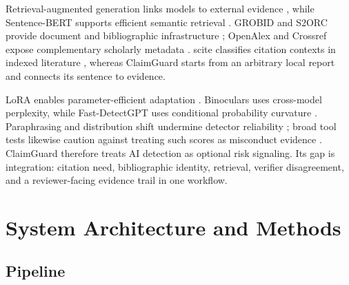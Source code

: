 \documentclass[12pt,toc=bib,toc=listof]{scrartcl}
\begin{document}
Retrieval-augmented generation links models to external evidence \cite{lewis2020}, while Sentence-BERT supports efficient semantic retrieval \cite{reimers2019}. GROBID and S2ORC provide document and bibliographic infrastructure \cite{lopez2009,lo2020}; OpenAlex and Crossref expose complementary scholarly metadata \cite{priem2022,crossref}. scite classifies citation contexts in indexed literature \cite{nicholson2021}, whereas ClaimGuard starts from an arbitrary local report and connects its sentence to evidence.

LoRA enables parameter-efficient adaptation \cite{hu2022}. Binoculars uses cross-model perplexity, while Fast-DetectGPT uses conditional probability curvature \cite{hans2024,bao2024}. Paraphrasing and distribution shift undermine detector reliability \cite{sadasivan2023}; broad tool tests likewise caution against treating such scores as misconduct evidence \cite{weberwulff2023}. ClaimGuard therefore treats AI detection as optional risk signaling. Its gap is integration: citation need, bibliographic identity, retrieval, verifier disagreement, and a reviewer-facing evidence trail in one workflow.

\section{System Architecture and Methods}

\subsection{Pipeline}
\end{document}
